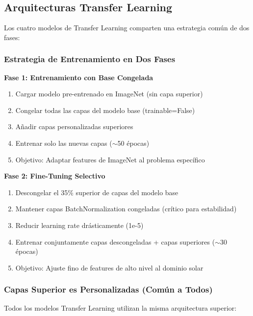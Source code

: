 \documentclass[11pt, a4paper]{article}
\begin{document}
\subsection{Arquitecturas Transfer Learning}

Los cuatro modelos de Transfer Learning comparten una estrategia común de dos fases:

\subsubsection{Estrategia de Entrenamiento en Dos Fases}

\textbf{Fase 1: Entrenamiento con Base Congelada}
\begin{enumerate}
    \item Cargar modelo pre-entrenado en ImageNet (sin capa superior)
    \item Congelar todas las capas del modelo base (trainable=False)
    \item Añadir capas personalizadas superiores
    \item Entrenar solo las nuevas capas ($\sim$50 épocas)
    \item Objetivo: Adaptar features de ImageNet al problema específico
\end{enumerate}

\textbf{Fase 2: Fine-Tuning Selectivo}
\begin{enumerate}
    \item Descongelar el 35\% superior de capas del modelo base
    \item Mantener capas BatchNormalization congeladas (crítico para estabilidad)
    \item Reducir learning rate drásticamente (1e-5)
    \item Entrenar conjuntamente capas descongeladas + capas superiores ($\sim$30 épocas)
    \item Objetivo: Ajuste fino de features de alto nivel al dominio solar
\end{enumerate}

\subsubsection{Capas Superior es Personalizadas (Común a Todos)}

Todos los modelos Transfer Learning utilizan la misma arquitectura superior:
\end{document}
